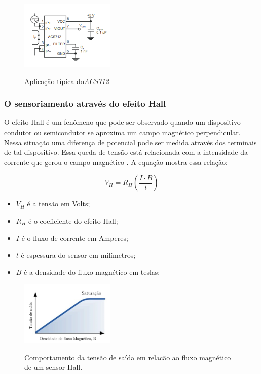 \begin{figure}[H]
	\centering
	\caption{Aplicação típica do\textit{ACS712}}
	\includegraphics[width=0.4\textwidth]{figuras/ACS712_typical.png}
	\label{fig:acs712_typical}
\end{figure} 

\subsubsection{O sensoriamento através do efeito Hall}

O efeito Hall é um fenômeno que pode ser observado quando um dispositivo condutor ou semicondutor se aproxima um campo magnético perpendicular. Nessa situação uma diferença de potencial pode ser medida através dos terminais de tal dispositivo. Essa queda de tensão está relacionada com a intensidade da corrente que gerou o campo magnético \cite{EletroctronicsTutorials}. A equação mostra essa relação: 

\begin{equation}
V_H = R_H\left ( \frac{I\cdot B}{t} \right)
\end{equation}

\begin{itemize}
	
	\item $V_H$ é a tensão em Volts;
	\item $R_H$ é o coeficiente do efeito Hall;
	\item  $I$ é o fluxo de corrente em Amperes;
	\item $t$ é espessura do sensor em milímetros;
	\item $B$ é a densidade do fluxo magnético em teslas; \ \\
\end{itemize}

\begin{figure}[H]
	\centering
	\caption{Comportamento da tensão de saída em relacão ao fluxo magnético de um sensor Hall.}
	\includegraphics[width=0.4\textwidth]{figuras/grafico_hall.jpg}
	\label{fig:efeito_hall}
\end{figure} 

